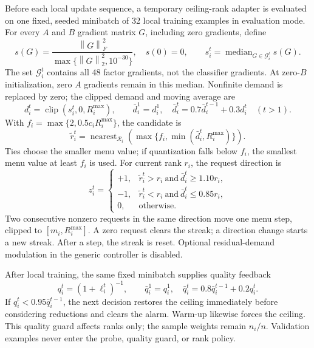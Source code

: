\documentclass[11pt]{article}
\newcommand{\norm}[1]{\left\lVert#1\right\rVert}
\newcommand{\clip}{\operatorname{clip}}
\newcommand{\median}{\operatorname{median}}
\begin{document}
Before each local update sequence, a temporary ceiling-rank adapter is evaluated on one fixed, seeded minibatch of 32 local training examples in evaluation mode. For every $A$ and $B$ gradient matrix $G$, including zero gradients, define
\begin{equation}
 s(G)=\frac{\norm{G}_F^2}{\max\{\norm{G}_2^2,10^{-30}\}},\quad s(0)=0,
 \qquad s_i^t=\median_{G\in\mathcal G_i^t}s(G).
 \label{eq:stable-rank}
\end{equation}
The set $\mathcal G_i^t$ contains all 48 factor gradients, not the classifier gradients. At zero-$B$ initialization, zero $A$ gradients remain in this median. Nonfinite demand is replaced by zero; the clipped demand and moving average are
\begin{equation}
 d_i^t=\clip(s_i^t,0,R_i^{\max}),\qquad
 \bar d_i^1=d_i^1,\quad \bar d_i^t=0.7\bar d_i^{t-1}+0.3d_i^t\quad(t>1).
\end{equation}
With $f_i=\max\{2,0.5c_iR_i^{\max}\}$, the candidate is
\begin{equation}
 \widetilde r_i^t=\operatorname{nearest}_{\mathcal R_i}
 \left(\max\{f_i,\min(\bar d_i^t,R_i^{\max})\}\right).
 \label{eq:rank-target}
\end{equation}
Ties choose the smaller menu value; if quantization falls below $f_i$, the smallest menu value at least $f_i$ is used. For current rank $r_i$, the request direction is
\begin{equation}
 z_i^t=\begin{cases}
 +1,&\widetilde r_i^t>r_i\ \text{and}\ \bar d_i^t\ge1.10r_i,\\
 -1,&\widetilde r_i^t<r_i\ \text{and}\ \bar d_i^t\le0.85r_i,\\
 0,&\text{otherwise}.
 \end{cases}
\end{equation}
Two consecutive nonzero requests in the same direction move one menu step, clipped to $[m_i,R_i^{\max}]$. A zero request clears the streak; a direction change starts a new streak. After a step, the streak is reset. Optional residual-demand modulation in the generic controller is disabled.

After local training, the same fixed minibatch supplies quality feedback
\begin{equation}
 q_i^t=(1+\ell_i^t)^{-1},\qquad
 \bar q_i^1=q_i^1,\quad \bar q_i^t=0.8\bar q_i^{t-1}+0.2q_i^t.
\end{equation}
If $q_i^t<0.95\bar q_i^{t-1}$, the next decision restores the ceiling immediately before considering reductions and clears the alarm. Warm-up likewise forces the ceiling. This quality guard affects ranks only; the sample weights remain $n_i/n$. Validation examples never enter the probe, quality guard, or rank policy.
\end{document}
